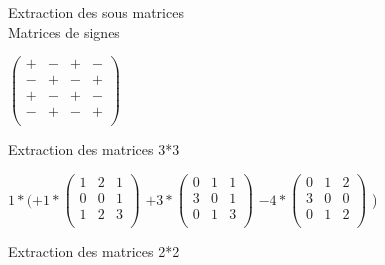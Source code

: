 Extraction des sous matrices \\

\vspace{5mm} %
Matrices de signes

\vspace{4mm} %

$
\begin{pmatrix}
  + & - & + & -\\
  - & + & - & +\\
  + & - & + & -\\
  - & + & - & +\\
\end{pmatrix}
$

\vspace{8mm} %
Extraction des matrices 3*3
\vspace{5mm} %

$
1*(
  +1*
  \begin{pmatrix}
    1 & 2 & 1 \\
    0 & 0 & 1 \\
    1 & 2 & 3 \\
  \end{pmatrix}
  $
  $
  +3*
  \begin{pmatrix}
    0 & 1 & 1 \\
    3 & 0 & 1 \\
    0 & 1 & 3 \\
  \end{pmatrix}
  $
  $
  -4*
  \begin{pmatrix}
    0 & 1 & 2 \\
    3 & 0 & 0 \\
    0 & 1 & 2 \\
  \end{pmatrix}
  $
)

\vspace{8mm} %
Extraction des matrices 2*2
\vspace{5mm} %

